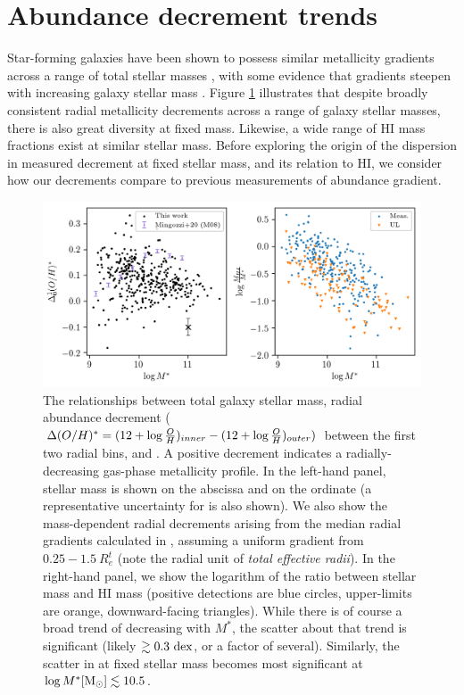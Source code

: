 \section{Abundance decrement trends}
\label{sec:trends}

Star-forming galaxies have been shown to possess similar metallicity gradients across a range of total stellar masses \citep{sanchez_2014_metgrad, belfiore_2017_manga-metgrad, mingozzi_2020}, with some evidence that gradients steepen with increasing galaxy stellar mass \citep{belfiore_2017_manga-metgrad, poetrodjojo_18, mingozzi_2020}. Figure \ref{fig:logmass-dec01-hifrac} illustrates that despite broadly consistent radial metallicity decrements across a range of galaxy stellar masses, there is also great diversity at fixed mass. Likewise, a wide range of HI mass fractions exist at similar stellar mass. Before exploring the origin of the dispersion in measured decrement at fixed stellar mass, and its relation to HI, we consider how our decrements compare to previous measurements of abundance gradient.

\begin{figure}
    \centering
    \includegraphics[width=5in]{logmass-dec01-hifrac}
    \caption[The correlations between total galaxy stellar mass, radial abundance decrement, and \hifrac, overlaid with transformed literature values.]{\fixspacing The relationships between total galaxy stellar mass, radial abundance decrement ($\Delta (O/H)^* = (12 + \log \frac{O}{H})_{inner} - (12 + \log \frac{O}{H})_{outer})$ between the first two radial bins, and \hifrac. A positive decrement indicates a radially-decreasing gas-phase metallicity profile. In the left-hand panel, stellar mass is shown on the abscissa and \metdec on the ordinate (a representative uncertainty for \metdec is also shown). We also show the mass-dependent radial decrements arising from the median radial gradients calculated in \citet{mingozzi_2020}, assuming a uniform gradient from $0.25-1.5 ~ R_e^t$ (note the radial unit of \emph{total effective radii}). In the right-hand panel, we show the logarithm of the ratio between stellar mass and HI mass (positive detections are blue circles, upper-limits are orange, downward-facing triangles). While there is of course a broad trend of decreasing \hifrac with $M^*$, the scatter about that trend is significant (likely $\gtrsim 0.3 ~ {\rm dex}$, or a factor of several). Similarly, the scatter in \metdec at fixed stellar mass becomes most significant at $\log M^* {\rm [M_{\odot}]} \lesssim 10.5$.}
    \label{fig:logmass-dec01-hifrac}
\end{figure}

